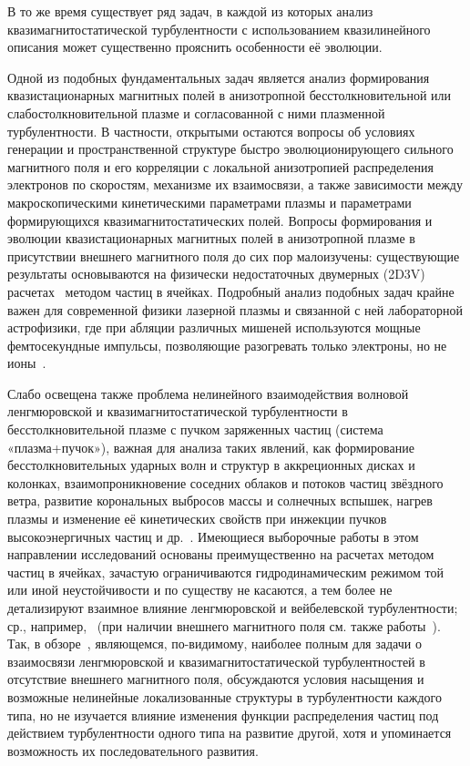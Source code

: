 В то же время существует ряд задач, в каждой из которых анализ квазимагнитостатической турбулентности с использованием квазилинейного описания может существенно прояснить особенности её эволюции.  

Одной из подобных фундаментальных задач является анализ формирования квазистационарных магнитных полей в анизотропной бесстолкновительной или слабостолкновительной плазме и согласованной с ними плазменной турбулентности.
В частности, открытыми остаются вопросы об условиях генерации и пространственной структуре быстро эволюционирующего сильного магнитного поля и его корреляции с локальной анизотропией распределения электронов по скоростям, механизме их взаимосвязи, а также зависимости между макроскопическими кинетическими параметрами плазмы и параметрами формирующихся квазимагнитостатических полей. 
Вопросы формирования и эволюции квазистационарных магнитных полей в анизотропной плазме в присутствии внешнего магнитного поля до сих пор малоизучены: существующие результаты основываются на физически недостаточных двумерных (2D3V) расчетах~\cite{Camporeale2008,Hellinger2014,Lazar2023,Lopez2020} методом частиц в ячейках.
Подробный анализ подобных задач крайне важен для современной физики лазерной плазмы и связанной с ней лабораторной астрофизики, где при абляции различных мишеней используются мощные фемтосекундные импульсы, позволяющие разогревать только электроны, но не ионы~\cite{Kato2010,Krasovsky2003,Romagnani2008,Malkov2016,Yoo2014,Park2012,Stepanov2022}.

Слабо освещена также проблема нелинейного взаимодействия волновой ленгмюровской и квазимагнитостатической турбулентности в бесстолкновительной плазме с пучком заряженных частиц (система «плазма+пучок»), важная для анализа таких явлений, как формирование бесстолкновительных ударных волн и структур в аккреционных дисках и колонках, взаимопроникновение соседних облаков и потоков частиц звёздного ветра, развитие корональных выбросов массы и солнечных вспышек, нагрев плазмы и изменение её кинетических свойств при инжекции пучков высокоэнергичных частиц и др.~\cite{Marcowith2016,Aschwanden2005,Medvedev2006,Nishikawa2009,Kato2007}. 
Имеющиеся выборочные работы в этом направлении исследований основаны преимущественно на расчетах методом частиц в ячейках, зачастую ограничиваются гидродинамическим режимом той или иной неустойчивости и по существу не касаются, а тем более не детализируют взаимное влияние ленгмюровской и вейбелевской  турбулентности; ср., например,~\cite{Kong2009,Ruyer2015,Bret2010,Lazar2023} (при наличии внешнего магнитного поля см. также работы~\cite{Lazar2023,Lopez2020}). 
Так, в обзоре~\cite{Bret2010}, являющемся, по-видимому, наиболее полным для задачи о взаимосвязи ленгмюровской и квазимагнитостатической турбулентностей в отсутствие внешнего магнитного поля, обсуждаются условия насыщения и возможные нелинейные локализованные структуры в турбулентности каждого типа, но не изучается влияние изменения функции распределения частиц под действием турбулентности одного типа на развитие другой, хотя и упоминается возможность их последовательного развития.

